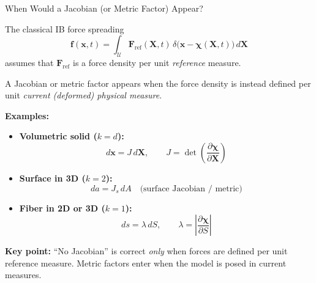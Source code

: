 \documentclass{beamer}
\begin{document}
\begin{frame}{When Would a Jacobian (or Metric Factor) Appear?}
\small

The classical IB force spreading
\[
\mathbf{f}(\mathbf{x},t)
=
\int_{\mathcal{U}}
\mathbf{F}_{\mathrm{ref}}(\mathbf{X},t)\,
\delta\!\big(\mathbf{x}-\boldsymbol{\chi}(\mathbf{X},t)\big)\,d\mathbf{X}
\]
assumes that $\mathbf{F}_{\mathrm{ref}}$ is a force density per unit
\emph{reference} measure.

\medskip

A Jacobian or metric factor appears when the force density is instead defined per unit
\emph{current (deformed) physical measure}.

\medskip

\textbf{Examples:}
\begin{itemize}
    \item \textbf{Volumetric solid ($k=d$):}
    \[
    d\mathbf{x} = J\,d\mathbf{X},
    \qquad
    J=\det\!\left(\frac{\partial\boldsymbol{\chi}}{\partial\mathbf{X}}\right)
    \]
    \item \textbf{Surface in 3D ($k=2$):}
    \[
    da = J_s\,dA \quad \text{(surface Jacobian / metric)}
    \]
    \item \textbf{Fiber in 2D or 3D ($k=1$):}
    \[
    ds = \lambda\,dS,
    \qquad
    \lambda = \left|\frac{\partial\boldsymbol{\chi}}{\partial S}\right|
    \]
\end{itemize}

\medskip

\textbf{Key point:}
“No Jacobian” is correct \emph{only} when forces are defined per unit reference measure.
Metric factors enter when the model is posed in current measures.

\end{frame}

\end{document}
